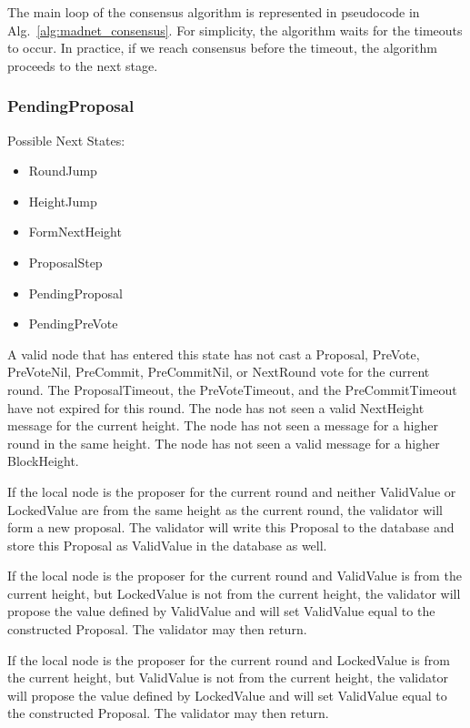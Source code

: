 The main loop of the consensus algorithm is represented
in pseudocode in Alg.~\ref{alg:madnet_consensus}.
For simplicity, the algorithm waits for the timeouts to occur.
In practice, if we reach consensus before the timeout,
the algorithm proceeds to the next stage.


\afterpage{\clearpage}


\subsubsection{PendingProposal}

Possible Next States:

\begin{itemize}
    \item RoundJump
    \item HeightJump
    \item FormNextHeight
    \item ProposalStep
    \item PendingProposal
    \item PendingPreVote
\end{itemize}

A valid node that has entered this state has not cast a Proposal,
PreVote, PreVoteNil, PreCommit, PreCommitNil, or NextRound vote for the
current round.
The ProposalTimeout, the PreVoteTimeout, and the
PreCommitTimeout have not expired for this round.
The node has not seen a valid NextHeight message for the current height.
The node has not seen a message for a higher round in the same height.
The node has not seen a valid message for a higher BlockHeight.

If the local node is the proposer for the current round and neither
ValidValue or LockedValue are from the same height as the current
round, the validator will form a new proposal.
The validator will write this Proposal to the database and store this
Proposal as ValidValue in the database as well.

If the local node is the proposer for the current round and ValidValue
is from the current height, but LockedValue is not from the current
height, the validator will propose the value defined by ValidValue and
will set ValidValue equal to the constructed Proposal.
The validator may then return.

If the local node is the proposer for the current round and LockedValue
is from the current height, but ValidValue is not from the current
height, the validator will propose the value defined by LockedValue and
will set ValidValue equal to the constructed Proposal.
The validator may then return.

